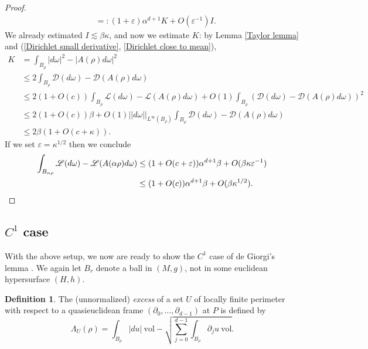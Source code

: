 \documentclass[reqno,12pt,letterpaper]{amsart}
\newcommand{\Lagrange}{\mathscr L}
\newcommand{\DirL}{\mathscr D}
\newcommand{\vol}{\mathrm{vol}}
\newcommand{\dfn}[1]{\emph{#1}\index{#1}}
\theoremstyle{definition}
\newtheorem{definition}[theorem]{Definition}
\numberwithin{equation}{section}
\begin{document}
\begin{proof}
\begin{align*}
&=: (1 + \varepsilon)\alpha^{d + 1}K + O(\varepsilon^{-1})I.
\end{align*}
We already estimated $I \lesssim \beta \kappa$, and now we estimate $K$: by Lemma \ref{Taylor lemma} and (\ref{Dirichlet small derivative}, \ref{Dirichlet close to mean}),
\begin{align*}
K &= \int_{B_\rho} |d\omega|^2 - |A(\rho)d\omega|^2\\
&\leq 2\int_{B_\rho} \DirL(d\omega) - \DirL(A(\rho)d\omega)\\
&\leq 2(1 + O(c))\int_{B_\rho} \Lagrange(d\omega) - \Lagrange(A(\rho)d\omega) + O(1) \int_{B_\rho} (\DirL(d\omega) - \DirL(A(\rho)d\omega))^2\\
&\leq 2(1 + O(c))\beta + O(1) ||d\omega||_{L^\infty(B_\rho)} \int_{B_\rho} \DirL(d\omega) - \DirL(A(\rho)d\omega) \\
&\leq 2\beta(1 + O(c + \kappa)).
\end{align*}
If we set $\varepsilon = \kappa^{1/2}$ then we conclude
\begin{align*}
\int_{B_{\alpha\rho}} \Lagrange(d\omega) - \Lagrange(A(\alpha\rho)d\omega)
&\leq (1 + O(c + \varepsilon)) \alpha^{d + 1}\beta + O(\beta \kappa \varepsilon^{-1})\\
&\leq (1 + O(c))\alpha^{d + 1} \beta + O(\beta \kappa^{1/2}). \qedhere
\end{align*}
\end{proof}

\subsection{$C^1$ case}
With the above setup, we now are ready to show the $C^1$ case of de Giorgi's lemma \cite[Teorema 4.4]{Miranda66}.
We again let $B_r$ denote a ball in $(M, g)$, not in some euclidean hypersurface $(H, h)$.

\begin{definition}
The (unnormalized) \dfn{excess} of a set $U$ of locally finite perimeter with respect to a quasieuclidean frame $(\partial_0, \dots, \partial_{d - 1})$ at $P$ is defined by
$$\Lambda_U(\rho) = \int_{B_\rho} |du| ~\vol - \sqrt{\sum_{j=0}^{d - 1} \int_{B_\rho} \partial_ju ~\vol}.$$
\end{definition}
\end{document}
